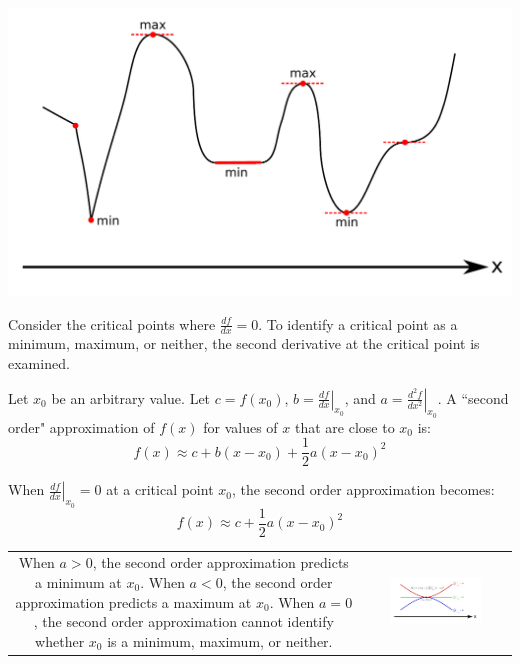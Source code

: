 \documentclass{article}
\begin{document}
\begin{center}
\includegraphics[width = \textwidth]{1_variable_function_critical_points}
\end{center}

Consider the critical points where \(\frac{df}{dx} = 0\). To identify a critical point as a minimum, maximum, or neither, the second derivative at the critical point is examined. 

Let \(x_0\) be an arbitrary value. Let \(c = f(x_0)\), \(b = \left.\frac{df}{dx}\right|_{x_0}\), and \(a = \left.\frac{d^2 f}{dx^2}\right|_{x_0}\). A ``second order" approximation of \(f(x)\) for values of \(x\) that are close to \(x_0\) is:  
\[f(x) \approx c + b(x - x_0) + \frac{1}{2}a(x - x_0)^2\]

When \(\left.\frac{df}{dx}\right|_{x_0} = 0\) at a critical point \(x_0\), the second order approximation becomes:
\[f(x) \approx c + \frac{1}{2}a(x - x_0)^2\]

\begin{tabular}{cc}
\parbox{0.35\textwidth}{  
When \(a > 0\), the second order approximation predicts a minimum at \(x_0\). When \(a < 0\), the second order approximation predicts a maximum at \(x_0\). When \(a = 0\), the second order approximation cannot identify whether \(x_0\) is a minimum, maximum, or neither.
} & \parbox{0.65\textwidth}{
\includegraphics[width = 0.65\textwidth]{1_variable_second_derivative_test}
}
\end{tabular}
\end{document}
